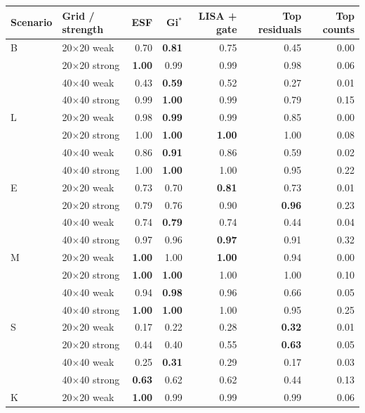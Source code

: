 {\tiny
\begin{tabular}{llrrrrr}
\toprule
Scenario & Grid / strength & ESF & Gi$^*$ & LISA + gate & Top residuals & Top counts \\
\midrule
B & 20$\times$20 weak & 0.70 & \textbf{0.81} & 0.75 & 0.45 & 0.00 \\
 & 20$\times$20 strong & \textbf{1.00} & 0.99 & 0.99 & 0.98 & 0.06 \\
 & 40$\times$40 weak & 0.43 & \textbf{0.59} & 0.52 & 0.27 & 0.01 \\
 & 40$\times$40 strong & 0.99 & \textbf{1.00} & 0.99 & 0.79 & 0.15 \\
\addlinespace
L & 20$\times$20 weak & 0.98 & \textbf{0.99} & 0.99 & 0.85 & 0.00 \\
 & 20$\times$20 strong & 1.00 & \textbf{1.00} & \textbf{1.00} & 1.00 & 0.08 \\
 & 40$\times$40 weak & 0.86 & \textbf{0.91} & 0.86 & 0.59 & 0.02 \\
 & 40$\times$40 strong & 1.00 & \textbf{1.00} & 1.00 & 0.95 & 0.22 \\
\addlinespace
E & 20$\times$20 weak & 0.73 & 0.70 & \textbf{0.81} & 0.73 & 0.01 \\
 & 20$\times$20 strong & 0.79 & 0.76 & 0.90 & \textbf{0.96} & 0.23 \\
 & 40$\times$40 weak & 0.74 & \textbf{0.79} & 0.74 & 0.44 & 0.04 \\
 & 40$\times$40 strong & 0.97 & 0.96 & \textbf{0.97} & 0.91 & 0.32 \\
\addlinespace
M & 20$\times$20 weak & \textbf{1.00} & 1.00 & \textbf{1.00} & 0.94 & 0.00 \\
 & 20$\times$20 strong & \textbf{1.00} & \textbf{1.00} & 1.00 & 1.00 & 0.10 \\
 & 40$\times$40 weak & 0.94 & \textbf{0.98} & 0.96 & 0.66 & 0.05 \\
 & 40$\times$40 strong & \textbf{1.00} & \textbf{1.00} & 1.00 & 0.95 & 0.25 \\
\addlinespace
S & 20$\times$20 weak & 0.17 & 0.22 & 0.28 & \textbf{0.32} & 0.01 \\
 & 20$\times$20 strong & 0.44 & 0.40 & 0.55 & \textbf{0.63} & 0.05 \\
 & 40$\times$40 weak & 0.25 & \textbf{0.31} & 0.29 & 0.17 & 0.03 \\
 & 40$\times$40 strong & \textbf{0.63} & 0.62 & 0.62 & 0.44 & 0.13 \\
\addlinespace
K & 20$\times$20 weak & \textbf{1.00} & 0.99 & 0.99 & 0.99 & 0.06 \\

\end{tabular}}
